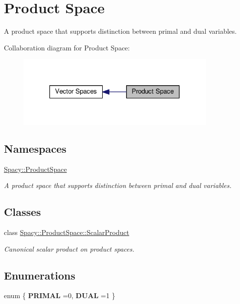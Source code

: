 \hypertarget{group__ProductSpaceGroup}{\section{Product Space}
\label{group__ProductSpaceGroup}
}


A product space that supports distinction between primal and dual variables.  


Collaboration diagram for Product Space\-:
\nopagebreak
\begin{figure}[H]
\begin{center}
\leavevmode
\includegraphics[width=280pt]{group__ProductSpaceGroup}
\end{center}
\end{figure}
\subsection*{Namespaces}
\begin{DoxyCompactItemize}
\item 
\hyperlink{namespaceSpacy_1_1ProductSpace}{Spacy\-::\-Product\-Space}
\begin{DoxyCompactList}\small\item\em A product space that supports distinction between primal and dual variables. \end{DoxyCompactList}\end{DoxyCompactItemize}
\subsection*{Classes}
\begin{DoxyCompactItemize}
\item 
class \hyperlink{classSpacy_1_1ProductSpace_1_1ScalarProduct}{Spacy\-::\-Product\-Space\-::\-Scalar\-Product}
\begin{DoxyCompactList}\small\item\em Canonical scalar product on product spaces. \end{DoxyCompactList}\end{DoxyCompactItemize}
\subsection*{Enumerations}
\begin{DoxyCompactItemize}
\item 
enum \{ {\bfseries P\-R\-I\-M\-A\-L} =0, 
{\bfseries D\-U\-A\-L} =1
 \}
\end{DoxyCompactItemize}
